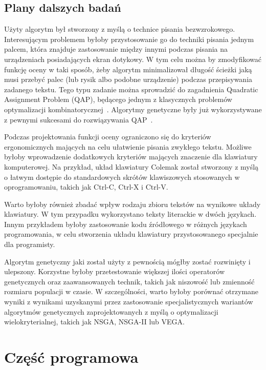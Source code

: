 \documentclass{xmgr}
\begin{document}
\section{Plany dalszych badań}

Użyty algorytm był stworzony z myślą o technice pisania bezwzrokowego. Interesującym problemem byłoby przystosowanie go do techniki pisania jednym palcem, która znajduje zastosowanie między innymi podczas pisania na urządzeniach posiadających ekran dotykowy. W tym celu można by zmodyfikować funkcję oceny w taki sposób, żeby algorytm minimalizował długość ścieżki jaką musi przebyć palec (lub rysik albo podobne urządzenie) podczas przepisywania zadanego tekstu. Tego typu zadanie można sprowadzić do zagadnienia Quadratic Assignment Problem (QAP), będącego jednym z klasycznych problemów optymalizacji kombinatorycznej~\cite{Ji_asolution}. Algorytmy genetyczne były już wykorzystywane z pewnymi sukcesami do rozwiązywania QAP~\cite{Misevicius200465}.

Podczas projektowania funkcji oceny ograniczono się do kryteriów ergonomicznych mających na celu ułatwienie pisania zwykłego tekstu. Możliwe byłoby wprowadzenie dodatkowych kryteriów mających znaczenie dla klawiatury komputerowej. Na przykład, układ klawiatury Colemak został stworzony z myślą o łatwym dostępie do standardowych skrótów klawiszowych stosowanych w oprogramowaniu, takich jak Ctrl-C, Ctrl-X i Ctrl-V.

Warto byłoby również zbadać wpływ rodzaju zbioru tekstów na wynikowe układy klawiatury. W tym przypadku wykorzystano teksty literackie w dwóch językach. Innym przykładem byłoby zastosowanie kodu źródłowego w różnych językach programowania, w celu stworzenia układu klawiatury przystosowanego specjalnie dla programisty.

Algorytm genetyczny jaki został użyty z pewnością mógłby zostać rozwinięty i ulepszony. Korzystne byłoby przetestowanie większej ilości operatorów genetycznych oraz zaawansowanych technik, takich jak niszowość lub zmienność rozmiaru populacji w czasie. W szczególności, warto byłoby porównać otrzymane wyniki z wynikami uzyskanymi przez zastosowanie specjalistycznych wariantów algorytmów genetycznych zaprojektowanych z myślą o optymalizacji wielokryterialnej, takich jak NSGA, NSGA-II lub VEGA.


\appendix
\chapter{Część programowa}
\end{document}
